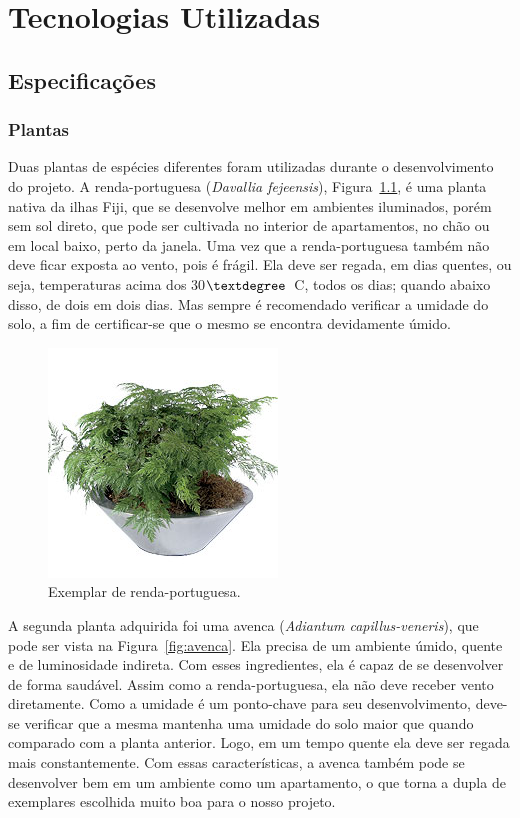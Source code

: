 \documentclass[a4paper,12pt]{report}
\begin{document}
\cleardoublepage
\chapter{Tecnologias Utilizadas}
	\label{cap:Tecnologias}
	\section{Especificações}
	
	\subsection{Plantas}
	Duas plantas de espécies diferentes foram utilizadas durante o desenvolvimento do projeto. A renda-portuguesa (\textit{Davallia fejeensis}), Figura~\ref{fig:renda}, é uma planta nativa da ilhas Fiji, que se desenvolve melhor em ambientes iluminados, porém sem sol direto, que pode ser cultivada no interior de apartamentos, no chão ou em local baixo, perto da janela. Uma vez que a renda-portuguesa também não deve ficar exposta ao vento, pois é frágil. Ela deve ser regada, em dias quentes, ou seja, temperaturas acima dos 30$\textdegree$~C, todos os dias; quando abaixo disso, de dois em dois dias. Mas sempre é recomendado verificar a umidade do solo, a fim de certificar-se que o mesmo se encontra devidamente úmido.
		
\begin{figure}[!h]
	\centering
	\includegraphics[width=0.4\linewidth]{figs/renda}
	\caption{Exemplar de renda-portuguesa.}
	\label{fig:renda}
\end{figure}

	A segunda planta adquirida foi uma avenca (\textit{Adiantum capillus-veneris}), que pode ser vista na Figura~\ref{fig:avenca}. Ela precisa de um ambiente úmido, quente e de luminosidade indireta. Com esses ingredientes, ela é capaz de se desenvolver de forma saudável. Assim como a renda-portuguesa, ela não deve receber vento diretamente. Como a umidade é um ponto-chave para seu desenvolvimento, deve-se verificar que a mesma mantenha uma umidade do solo maior que quando comparado com a planta anterior. Logo, em um tempo quente ela deve ser regada mais constantemente. Com essas características, a avenca também pode se desenvolver bem em um ambiente como um apartamento, o que torna a dupla de exemplares escolhida muito boa para o nosso projeto. 
	
\end{document}
